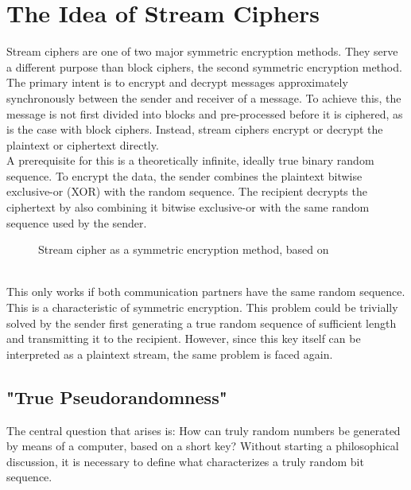 \section{The Idea of Stream Ciphers}

Stream ciphers are one of two major symmetric encryption methods. They serve a different purpose than block ciphers, the second symmetric encryption method. The primary intent is to encrypt and decrypt messages approximately synchronously between the sender and receiver of a message. To achieve this, the message is not first divided into blocks and pre-processed before it is ciphered, as is the case with block ciphers. Instead, stream ciphers encrypt or decrypt the plaintext or ciphertext directly. \cite[p. 223]{Schneier.2006} \\

A prerequisite for this is a theoretically infinite, ideally true binary random sequence. To encrypt the data, the sender combines the plaintext bitwise exclusive-or (XOR) with the random sequence. The recipient decrypts the ciphertext by also combining it bitwise exclusive-or with the same random sequence used by the sender.
\begin{figure}[h]
	\centering
	
	\caption{Stream cipher as a symmetric encryption method, based on \cite[p. 232]{Schneier.2006}}
	\label{fig:Figure_1}
\end{figure}
\\ This only works if both communication partners have the same random sequence. This is a characteristic of symmetric encryption. \cite[pp. 319-320]{Schmeh.2016} This problem could be trivially solved by the sender first generating a true random sequence of sufficient length and transmitting it to the recipient. However, since this key itself can be interpreted as a plaintext stream, the same problem is faced again.
\subsection{"True Pseudorandomness"}
The central question that arises is: How can truly random numbers be generated by means of a computer, based on a short key? \cite[p. 53]{Beutelspacher.2005} Without starting a philosophical discussion, it is necessary to define what characterizes a truly random bit sequence. \\

